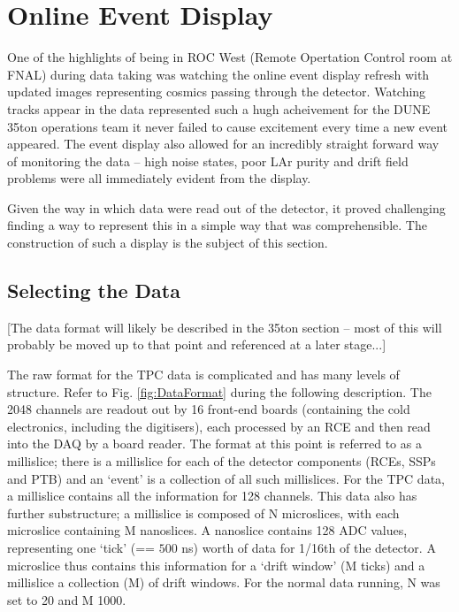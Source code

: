 \section{Online Event Display}\label{sec:EventDisplay}

One of the highlights of being in ROC West (Remote Opertation Control room at FNAL) during data taking was watching the online event display refresh with updated images representing cosmics passing through the detector.  Watching tracks appear in the data represented such a hugh acheivement for the DUNE 35ton operations team it never failed to cause excitement every time a new event appeared.  The event display also allowed for an incredibly straight forward way of monitoring the data -- high noise states, poor LAr purity and drift field problems were all immediately evident from the display.

Given the way in which data were read out of the detector, it proved challenging finding a way to represent this in a simple way that was comprehensible.  The construction of such a display is the subject of this section.

\subsection{Selecting the Data}\label{sec:SelectingEVDData}

[The data format will likely be described in the 35ton section -- most of this will probably be moved up to that point and referenced at a later stage...]

The raw format for the TPC data is complicated and has many levels of structure.  Refer to Fig. \ref{fig:DataFormat} during the following description.  The 2048 channels are readout out by 16 front-end boards (containing the cold electronics, including the digitisers), each processed by an RCE and then read into the DAQ by a board reader.  The format at this point is referred to as a millislice; there is a millislice for each of the detector components (RCEs, SSPs and PTB) and an `event' is a collection of all such millislices.  For the TPC data, a millislice contains all the information for 128 channels.  This data also has further substructure; a millislice is composed of N microslices, with each microslice containing M nanoslices.  A nanoslice contains 128 ADC values, representing one `tick' (== $500$ ns) worth of data for 1/16th of the detector.  A microslice thus contains this information for a `drift window' (M ticks) and a millislice a collection (M) of drift windows.  For the normal data running, N was set to 20 and M 1000.

